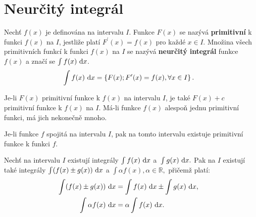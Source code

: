 \section{Neurčitý integrál}
\begin{definition}\label{integral}
Nechť $f(x)$ je definována na intervalu $I$. Funkce $F(x)$ se nazývá \textbf{primitivní}
k funkci $f(x)$ na $I$, jestliže platí $F^\prime(x)=f(x)$ pro každé $x\in I.$
Množina všech primitivních funkcí k funkci $f(x)$ na $I$ se nazývá \textbf{neurčitý integrál} funkce $f(x)$ a značí se $\int f(x) \, \mathop{}\!\mathrm{d} x$.
$$\int f(x)\, \mathop{}\!\mathrm{d} x= \left \{ F(x); F^\prime(x) = f(x), \forall x \in I\right \}. $$
\end{definition}

\begin{veta}
    Je-li $F(x)$ primitivní funkce k $f(x)$ na intervalu $I$, je také
    $F(x)+c$ primitivní funkce k $f(x)$ na $I$. Má-li funkce $f(x)$ alespoň
    jednu primitivní funkci, má jich nekonečně mnoho.
\end{veta}

\begin{veta}
Je-li funkce $f$ spojitá na intervalu $I$, pak na tomto intervalu existuje
primitivní funkce k funkci $f$.
\end{veta}

\begin{veta}
Nechť na intervalu $I$ existují integrály $\int f(x) \, \mathop{}\!\mathrm{d} x$ a~$\int g(x)\, \mathop{}\!\mathrm{d} x.$
Pak na $I$ existují také integrály $\int(f(x)\pm g(x))\, \mathop{}\!\mathrm{d} x$ a $\int \alpha f(x), \alpha \in \mathbb R,$ přičemž platí:
\begin{align*}
\int (f(x)\pm g(x)) \, \mathop{}\!\mathrm{d} x &= \int f(x)\, \mathop{}\!\mathrm{d} x \pm \int g(x) \, \mathop{}\!\mathrm{d} x,\\
\int \alpha f(x)\, \mathop{}\!\mathrm{d} x &= \alpha\int f(x)\, \mathop{}\!\mathrm{d} x.
\end{align*}
\end{veta}

